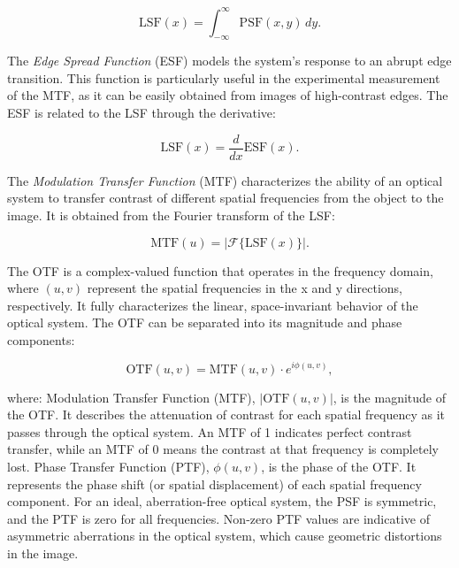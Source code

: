\begin{equation}
\text{LSF}(x) = \int_{-\infty}^{\infty} \text{PSF}(x,y) \, dy.
\end{equation}

\noindent The \textit{Edge Spread Function} (ESF) models the system's response to an abrupt edge transition. This function is particularly useful in the experimental measurement of the MTF, as it can be easily obtained from images of high-contrast edges. The ESF is related to the LSF through the derivative:

\begin{equation}
\text{LSF}(x) = \frac{d}{dx} \text{ESF}(x).
\end{equation}

\noindent The \textit{Modulation Transfer Function} (MTF) characterizes the ability of an optical system to transfer contrast of different spatial frequencies from the object to the image. It is obtained from the Fourier transform of the LSF:

\begin{equation}
\text{MTF}(u) = \left| \mathcal{F} \{ \text{LSF}(x) \} \right|.
\end{equation}

\noindent The OTF is a complex-valued function that operates in the frequency domain, where $(u,v)$ represent the spatial frequencies in the x and y directions, respectively. It fully characterizes the linear, space-invariant behavior of the optical system. The OTF can be separated into its magnitude and phase components:

\begin{equation} \text{OTF}(u,v) = \text{MTF}(u,v) \cdot e^{i\phi(u,v)}, \end{equation}

where: Modulation Transfer Function (MTF), $|\text{OTF}(u,v)|$, is the magnitude of the OTF. It describes the attenuation of contrast for each spatial frequency as it passes through the optical system. An MTF of 1 indicates perfect contrast transfer, while an MTF of 0 means the contrast at that frequency is completely lost. Phase Transfer Function (PTF), $\phi(u,v)$, is the phase of the OTF. It represents the phase shift (or spatial displacement) of each spatial frequency component. For an ideal, aberration-free optical system, the PSF is symmetric, and the PTF is zero for all frequencies. Non-zero PTF values are indicative of asymmetric aberrations in the optical system, which cause geometric distortions in the image.\\

